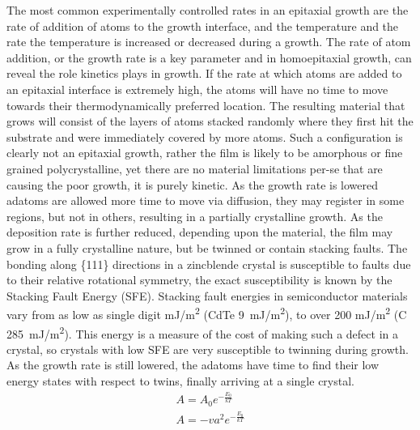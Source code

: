 The most common experimentally controlled rates in an epitaxial growth are the rate of addition of atoms to the growth interface, and the temperature and the rate the temperature is increased or decreased during a growth. The rate of atom addition, or the growth rate is a key parameter and in homoepitaxial growth, can reveal the role kinetics plays in growth. If the rate at which atoms are added to an epitaxial interface is extremely high, the atoms will have no time to move towards their thermodynamically preferred location. The resulting material that grows will consist of the layers of atoms stacked randomly where they first hit the substrate and were immediately covered by more atoms. Such a configuration is clearly not an epitaxial growth, rather the film is likely to be amorphous or fine grained polycrystalline, yet there are no material limitations per-se that are causing the poor growth, it is purely kinetic. As the growth rate is lowered adatoms are allowed more time to move via diffusion, they may register in some regions, but not in others, resulting in a partially crystalline growth. As the deposition rate is further reduced, depending upon the material, the film may grow in a fully crystalline nature, but be twinned or contain stacking faults. The bonding along \{111\} directions in a zincblende crystal is susceptible to faults due to their relative rotational symmetry, the exact susceptibility is known by the Stacking Fault Energy (SFE)\cite{Duffar2010}. Stacking fault energies in semiconductor materials vary from as low as single digit mJ/m\textsuperscript{2} (CdTe 9~mJ/m\textsuperscript{2}), to over 200 mJ/m\textsuperscript{2} (C 285~mJ/m\textsuperscript{2})\cite{Takeuchi1999}.  This energy is a measure of the cost of making such a defect in a crystal, so crystals with low SFE are very susceptible to twinning during growth. As the growth rate is still lowered, the adatoms have time to find their low energy states with respect to twins, finally arriving at a single crystal.
\begin{align}
A = A_0 e^{-\frac{E_0}{kT}} \label{eqn:arrhenius} \\
A = - v a^2 e^{-\frac{E_0}{kT}}
\end{align}
